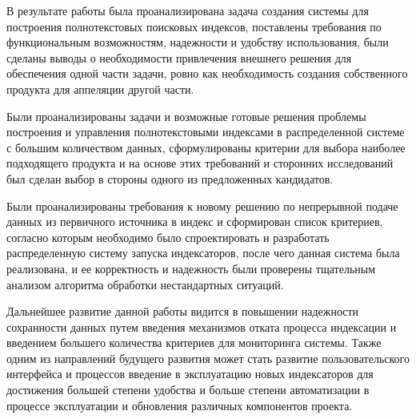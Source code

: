 
В результате работы была проанализирована задача создания системы для построения полнотекстовых поисковых индексов, поставлены требования по функциональным возможностям, надежности и удобству использования, были сделаны выводы о необходимости привлечения внешнего решения для обеспечения одной части задачи, ровно как необходимость создания собственного продукта для аппеляции другой части.

Были проанализированы задачи и возможные готовые решения проблемы построения и управления полнотекстовыми индексами в распределенной системе с большим количеством данных, сформулированы критерии для выбора наиболее подходящего продукта и на основе этих требований и сторонних исследований был сделан выбор в стороны одного из предложенных кандидатов.

Были проанализированы требования к новому решению по непрерывной подаче данных из первичного источника в индекс и сформирован список критериев, согласно которым необходимо было спроектировать и разработать распределенную систему запуска индексаторов, после чего данная система была реализована, и ее корректность и надежность были проверены тщательным анализом алгоритма обработки нестандартных ситуаций.

Дальнейшее развитие данной работы видится в повышении надежности сохранности данных путем введения механизмов отката процесса индексации и введением большего количества критериев для мониторинга системы. Также одним из направлений будущего развития может стать развитие пользовательского интерфейса и процессов введение в эксплуатацию новых индексаторов для достижения большей степени удобства и больше степени автоматизации в процессе эксплуатации и обновления различных компонентов проекта.

\clearpage
